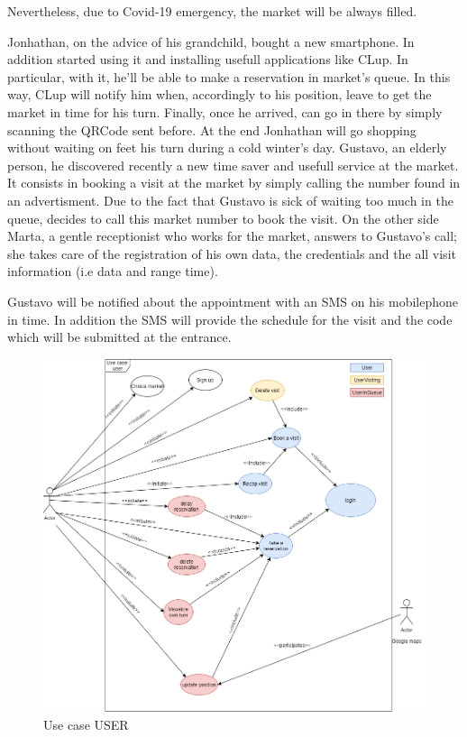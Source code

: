 Nevertheless, due to Covid-19 emergency, the market will be always filled.

Jonhathan, on the advice of his grandchild, bought a new smartphone.  In addition started using it and installing usefull applications like CLup.
In particular, with it, he'll be able to make a reservation in market's queue. In this way, CLup will notify him when, accordingly to his position, leave to get the market in time for his turn.
Finally, once he arrived, can go in there by simply scanning the QRCode sent before. 
At the end Jonhathan will go shopping without waiting on feet his turn during a cold winter's day.
Gustavo, an elderly person, he discovered recently a new time saver and usefull service at the market. It consists in booking a visit at the market by simply calling the number found in an advertisment. 
Due to the fact that Gustavo is sick of waiting too much in the queue, decides to call this market number to book the visit.
On the other side Marta, a gentle receptionist who works for the market, answers to Gustavo's call; she takes care of the registration of his own data, the credentials and the all visit information (i.e data and range time).

Gustavo will be notified about the appointment with an SMS on his mobilephone in time. In addition the SMS will provide the schedule for the visit and the code which will be submitted at the entrance.

\begin{figure}[h]
	\caption{Use case USER}
	\label{fig:UML}
	
	\centering
	\includegraphics[width=1\textwidth, height=1\textwidth]{diagrams/UseCaseUser.png}
	
\end{figure}

